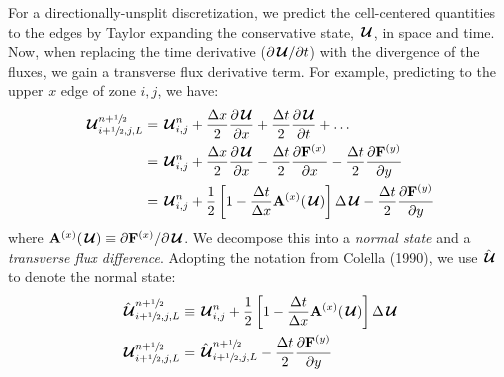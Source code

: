 For a directionally-unsplit discretization, we predict the
cell-centered quantities to the edges by Taylor expanding the
conservative state, ${\,\boldsymbol{\mathcal{U}}}$, in space and time.  Now, when replacing the
time derivative ($\partial {\,\boldsymbol{\mathcal{U}}}/\partial t$) with the divergence of the
fluxes, we gain a transverse flux derivative term.  For example,
predicting to the upper $x$ edge of zone $i,j$, we have:
\begin{align}
{\,\boldsymbol{\mathcal{U}}}_{i+{\sfrac{1}{2}},j,L}^{n+{\sfrac{1}{2}}} &= {\,\boldsymbol{\mathcal{U}}}_{i,j}^n + \frac{\Delta x}{2} \frac{\partial {\,\boldsymbol{\mathcal{U}}}}{\partial x}
                            + \frac{\Delta t}{2} \frac{\partial {\,\boldsymbol{\mathcal{U}}}}{\partial t} + \ldots \\
&= {\,\boldsymbol{\mathcal{U}}}_{i,j}^n + \frac{\Delta x}{2} \frac{\partial {\,\boldsymbol{\mathcal{U}}}}{\partial x}
                            - \frac{\Delta t}{2} \frac{\partial {\bf F}^{(x)}}{\partial x}
                            - \frac{\Delta t}{2} \frac{\partial {\bf F}^{(y)}}{\partial y} \\
&= {\,\boldsymbol{\mathcal{U}}}_{i,j}^n + \frac{1}{2} \left [ 1 - \frac{\Delta t}{\Delta x} {\bf A}^{(x)}({\,\boldsymbol{\mathcal{U}}}) \right ] \Delta {\,\boldsymbol{\mathcal{U}}}
                            - \frac{\Delta t}{2} \frac{\partial {\bf F}^{(y)}}{\partial y} \label{eq:Utaylorstate}
\end{align}
where ${\bf A}^{(x)}({\,\boldsymbol{\mathcal{U}}}) \equiv \partial {\bf F}^{(x)} / \partial {\,\boldsymbol{\mathcal{U}}}$.  We decompose
this into a {\em normal state} and a {\em transverse flux difference}.
Adopting the notation from Colella (1990), we use $\hat{{\,\boldsymbol{\mathcal{U}}}}$ to denote
the normal state:
\begin{align}
\hat{{\,\boldsymbol{\mathcal{U}}}}_{i+{\sfrac{1}{2}},j,L}^{n+{\sfrac{1}{2}}} &\equiv {\,\boldsymbol{\mathcal{U}}}_{i,j}^n
      + \frac{1}{2} \left [ 1 - \frac{\Delta t}{\Delta x} {\bf A}^{(x)}({\,\boldsymbol{\mathcal{U}}}) \right ] \Delta {\,\boldsymbol{\mathcal{U}}} \\
{\,\boldsymbol{\mathcal{U}}}_{i+{\sfrac{1}{2}},j,L}^{n+{\sfrac{1}{2}}} &= \hat{{\,\boldsymbol{\mathcal{U}}}}_{i+{\sfrac{1}{2}},j,L}^{n+{\sfrac{1}{2}}}
                            - \frac{\Delta t}{2} \frac{\partial {\bf F}^{(y)}}{\partial y}  \label{eq:fullleftstate}
\end{align}

